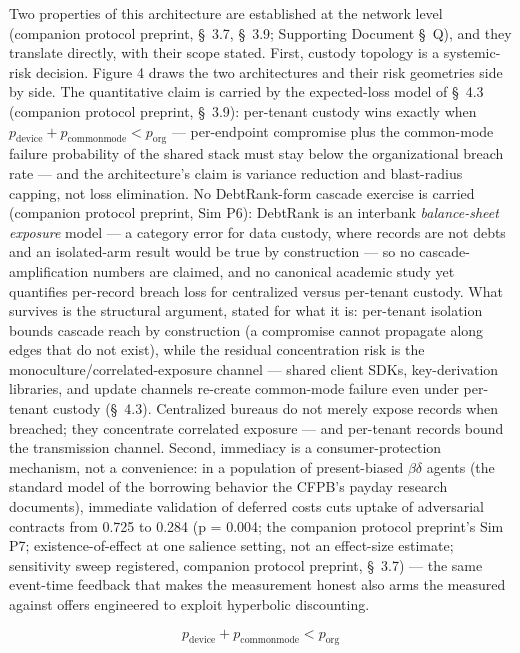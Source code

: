 \documentclass[
]{article}
\begin{document}
Two properties of this architecture are established at the network level
(companion protocol preprint, §~3.7, §~3.9; Supporting Document §~Q),
and they translate directly, with their scope stated. First, custody
topology is a systemic-risk decision. Figure 4 draws the two
architectures and their risk geometries side by side. The quantitative
claim is carried by the expected-loss model of §~4.3 (companion protocol
preprint, §~3.9): per-tenant custody wins exactly when
\(p_{\mathrm{device}} + p_{\mathrm{commonmode}} < p_{\mathrm{org}}\) ---
per-endpoint compromise plus the common-mode failure probability of the
shared stack must stay below the organizational breach rate --- and the
architecture's claim is variance reduction and blast-radius capping, not
loss elimination. No DebtRank-form cascade exercise is carried
(companion protocol preprint, Sim P6): DebtRank is an interbank
\emph{balance-sheet exposure} model --- a category error for data
custody, where records are not debts and an isolated-arm result would be
true by construction --- so no cascade-amplification numbers are
claimed, and no canonical academic study yet quantifies per-record
breach loss for centralized versus per-tenant custody. What survives is
the structural argument, stated for what it is: per-tenant isolation
bounds cascade reach by construction (a compromise cannot propagate
along edges that do not exist), while the residual concentration risk is
the monoculture/correlated-exposure channel --- shared client SDKs,
key-derivation libraries, and update channels re-create common-mode
failure even under per-tenant custody (§~4.3). Centralized bureaus do
not merely expose records when breached; they concentrate correlated
exposure --- and per-tenant records bound the transmission channel.
Second, immediacy is a consumer-protection mechanism, not a convenience:
in a population of present-biased \(\beta\delta\) agents (the standard
model of the borrowing behavior the CFPB's payday research documents),
immediate validation of deferred costs cuts uptake of adversarial
contracts from 0.725 to 0.284 (p = 0.004; the companion protocol
preprint's Sim P7; existence-of-effect at one salience setting, not an
effect-size estimate; sensitivity sweep registered, companion protocol
preprint, §~3.7) --- the same event-time feedback that makes the
measurement honest also arms the measured against offers engineered to
exploit hyperbolic discounting.

\begin{equation}
p_{\mathrm{device}} + p_{\mathrm{commonmode}} < p_{\mathrm{org}}
\label{eq:breakeven}
\end{equation}
\end{document}
